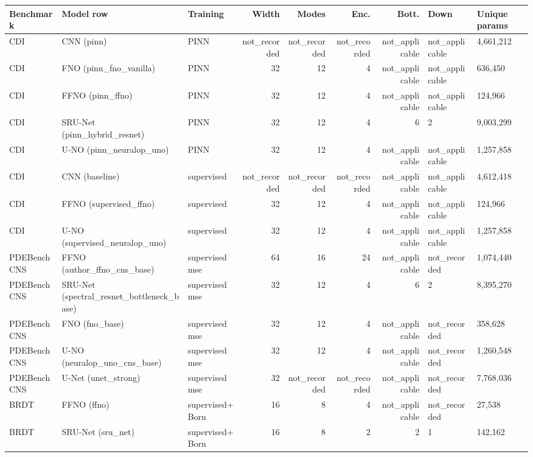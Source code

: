 \begin{tabular}{lllrrrrll}
\toprule
Benchmark & Model row & Training & Width & Modes & Enc. & Bott. & Down & Unique params \\
\midrule
CDI & CNN (pinn) & PINN & not\_recorded & not\_recorded & not\_recorded & not\_applicable & not\_applicable & 4,661,212 \\
CDI & FNO (pinn\_fno\_vanilla) & PINN & 32 & 12 & 4 & not\_applicable & not\_applicable & 636,450 \\
CDI & FFNO (pinn\_ffno) & PINN & 32 & 12 & 4 & not\_applicable & not\_applicable & 124,966 \\
CDI & SRU-Net (pinn\_hybrid\_resnet) & PINN & 32 & 12 & 4 & 6 & 2 & 9,003,299 \\
CDI & U-NO (pinn\_neuralop\_uno) & PINN & 32 & 12 & 4 & not\_applicable & not\_applicable & 1,257,858 \\
CDI & CNN (baseline) & supervised & not\_recorded & not\_recorded & not\_recorded & not\_applicable & not\_applicable & 4,612,418 \\
CDI & FFNO (supervised\_ffno) & supervised & 32 & 12 & 4 & not\_applicable & not\_applicable & 124,966 \\
CDI & U-NO (supervised\_neuralop\_uno) & supervised & 32 & 12 & 4 & not\_applicable & not\_applicable & 1,257,858 \\
\midrule
PDEBench CNS & FFNO (author\_ffno\_cns\_base) & supervised mse & 64 & 16 & 24 & not\_applicable & not\_recorded & 1,074,440 \\
PDEBench CNS & SRU-Net (spectral\_resnet\_bottleneck\_base) & supervised mse & 32 & 12 & 4 & 6 & 2 & 8,395,270 \\
PDEBench CNS & FNO (fno\_base) & supervised mse & 32 & 12 & 4 & not\_applicable & not\_recorded & 358,628 \\
PDEBench CNS & U-NO (neuralop\_uno\_cns\_base) & supervised mse & 32 & 12 & 4 & not\_applicable & not\_recorded & 1,260,548 \\
PDEBench CNS & U-Net (unet\_strong) & supervised mse & 32 & not\_recorded & not\_recorded & not\_applicable & not\_recorded & 7,768,036 \\
\midrule
BRDT & FFNO (ffno) & supervised+Born & 16 & 8 & 4 & not\_applicable & not\_recorded & 27,538 \\
BRDT & SRU-Net (sru\_net) & supervised+Born & 16 & 8 & 2 & 2 & 1 & 142,162 \\
\bottomrule
\end{tabular}
